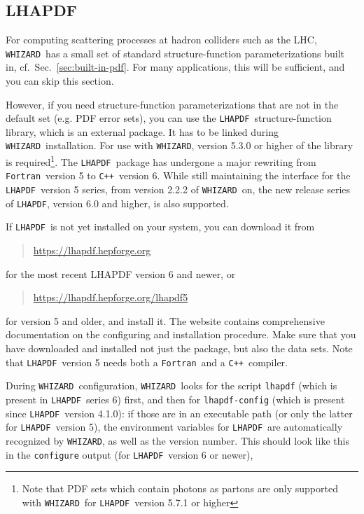 \documentclass[12pt]{book}
\newcommand{\ttt}[1]{\texttt{#1}}
\newcommand{\whizard}{\ttt{WHIZARD}}
\newcommand{\lhapdf}{\ttt{LHAPDF}}
\newcommand{\cpp}{\ttt{C++}}
\newcommand{\fortran}{\ttt{Fortran}}
\begin{document}

\subsection{LHAPDF}
\label{sec:lhapdf_install}

For computing scattering processes at hadron colliders such as the
LHC, \whizard\ has a small set of standard structure-function
parameterizations built in, cf.\ Sec.~\ref{sec:built-in-pdf}.  For
many applications, this will be sufficient, and you can skip this
section.

However, if you need structure-function parameterizations that are not
in the default set (e.g. PDF error sets), you can use the \lhapdf\
structure-function library, which is an external package.  It has to
be linked during \whizard\ installation.  For use with \whizard,
version 5.3.0 or higher of the library is required\footnote{ Note that
  PDF sets which contain photons as partons are only supported with
  \whizard\ for \lhapdf\ version 5.7.1 or higher}. The \lhapdf\
package has undergone a major rewriting from \fortran\ version 5
to \cpp\ version 6. While still maintaining the interface for
the \lhapdf\ version 5 series, from version 2.2.2 of \whizard\ on, the
new release series of \lhapdf, version 6.0 and higher, is also
supported.

If \lhapdf\ is not yet installed on your system, you can download it from
\begin{quote}
  \url{https://lhapdf.hepforge.org}
\end{quote}
for the most recent LHAPDF version 6 and newer, or
\begin{quote}
  \url{https://lhapdf.hepforge.org/lhapdf5}
\end{quote}
for version 5 and older, and install it.  The website contains
comprehensive documentation on the configuring and installation
procedure.  Make sure that you have downloaded and installed not just
the package, but also the data sets. Note that \lhapdf\ version 5
needs both a \fortran\ and a \cpp\ compiler.

During \whizard\ configuration, \whizard\ looks for the script
\ttt{lhapdf} (which is present in \lhapdf\ series 6) first, and then
for \ttt{lhapdf-config} (which is present since \lhapdf\ version
4.1.0): if those are in an executable path (or only
the latter for \lhapdf\ version 5), the environment variables for
\lhapdf\ are automatically recognized by \whizard, as well as the
version number. This should look like this in the \ttt{configure}
output (for \lhapdf\ version 6 or newer),
\end{document}
